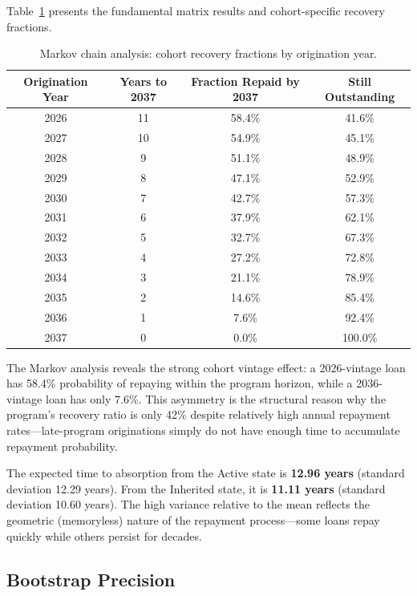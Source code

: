 \documentclass[11pt, letterpaper]{article}
\begin{document}
Table~\ref{tab:markov_results} presents the fundamental matrix results and cohort-specific recovery fractions.

\begin{table}[H]
  \centering
  \caption{Markov chain analysis: cohort recovery fractions by origination year.}
  \label{tab:markov_results}
  \begin{tabular}{@{}cccc@{}}
    \toprule
    \textbf{Origination Year} & \textbf{Years to 2037} & \textbf{Fraction Repaid by 2037} & \textbf{Still Outstanding} \\
    \midrule
    2026 & 11 & 58.4\% & 41.6\% \\
    2027 & 10 & 54.9\% & 45.1\% \\
    2028 & 9 & 51.1\% & 48.9\% \\
    2029 & 8 & 47.1\% & 52.9\% \\
    2030 & 7 & 42.7\% & 57.3\% \\
    2031 & 6 & 37.9\% & 62.1\% \\
    2032 & 5 & 32.7\% & 67.3\% \\
    2033 & 4 & 27.2\% & 72.8\% \\
    2034 & 3 & 21.1\% & 78.9\% \\
    2035 & 2 & 14.6\% & 85.4\% \\
    2036 & 1 & 7.6\% & 92.4\% \\
    2037 & 0 & 0.0\% & 100.0\% \\
    \bottomrule
  \end{tabular}
\end{table}

The Markov analysis reveals the strong cohort vintage effect: a 2026-vintage loan has 58.4\% probability of repaying within the program horizon, while a 2036-vintage loan has only 7.6\%. This asymmetry is the structural reason why the program's recovery ratio is only 42\% despite relatively high annual repayment rates---late-program originations simply do not have enough time to accumulate repayment probability.

The expected time to absorption from the Active state is \textbf{12.96 years} (standard deviation 12.29 years). From the Inherited state, it is \textbf{11.11 years} (standard deviation 10.60 years). The high variance relative to the mean reflects the geometric (memoryless) nature of the repayment process---some loans repay quickly while others persist for decades.

\subsection{Bootstrap Precision}
\end{document}
